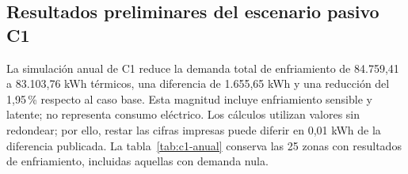 \par\medskip
\subsection{Resultados preliminares del escenario pasivo C1}
\label{sec:c1-resultados}
La simulación anual de C1 reduce la demanda total de enfriamiento de 84.759,41 a 83.103,76 kWh térmicos, una diferencia de 1.655,65 kWh y una reducción del 1,95\,\% respecto al caso base. Esta magnitud incluye enfriamiento sensible y latente; no representa consumo eléctrico. Los cálculos utilizan valores sin redondear; por ello, restar las cifras impresas puede diferir en 0,01 kWh de la diferencia publicada. La tabla~\ref{tab:c1-anual} conserva las 25 zonas con resultados de enfriamiento, incluidas aquellas con demanda nula.

